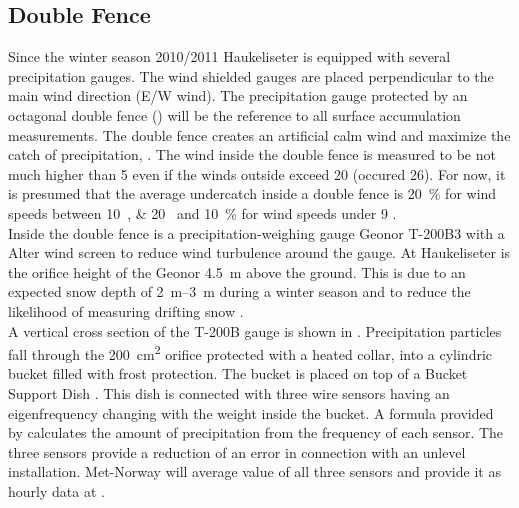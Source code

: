 \subsection{Double Fence}\label{sec:dofe}

Since the winter season 2010/2011 Haukeliseter is equipped with several precipitation gauges. The wind shielded gauges are placed perpendicular to the main wind direction (E/W wind).
The precipitation gauge protected by an octagonal double fence () will be the reference to all surface accumulation measurements. The double fence creates an artificial calm wind and maximize the catch of precipitation, \citep{wolff_new_2010, wolff_measurements_2013, wolff_derivation_2015}. The wind inside the double fence is measured to be not much higher than \SI{5}{\mPs} even if the winds outside exceed \SI{20}{\mPs} (occured \SI{26}{\dec}). %
For now, it is presumed that the average undercatch inside a double fence is \SI{20}{\percent} for wind speeds between \SIlist{10;20}{\mPs} and \SI{10}{\percent} for wind speeds under \SI{9}{\mPs} \citep{wolff_wmo_2018}.
\\
Inside the double fence is a precipitation-weighing gauge Geonor T-200B3 \citep[3-wire transducers, \SI{1000}{\mm},][]{geonor_inc._t-200b_2015} with a Alter wind screen to reduce wind turbulence around the gauge. At Haukeliseter is the orifice height of the Geonor \SI{4.5}{\metre} above the ground. This is due to an expected snow depth of \SIrange{2}{3}{\metre} during a winter season and to reduce the likelihood of measuring drifting snow \citep{wolff_measurements_2013,wolff_derivation_2015}. \\
A vertical cross section of the T-200B gauge is shown in . Precipitation particles fall through the \SI{200}{\square\cm} orifice protected with a heated collar, into a cylindric bucket filled with frost protection. The bucket is placed on top of a Bucket Support Dish \citep[,][]{geonor_inc._t-200b_2015}. This dish is connected with three wire sensors having an eigenfrequency changing with the weight inside the bucket. A formula provided by \cite{geonor_inc._t-200b_2015} calculates the amount of precipitation from the frequency of each sensor. The three sensors provide a reduction of an error in connection with an unlevel installation. Met-Norway will average value of all three sensors and provide it as hourly data at \citeauthor{eklima_norwegian_2016}.

